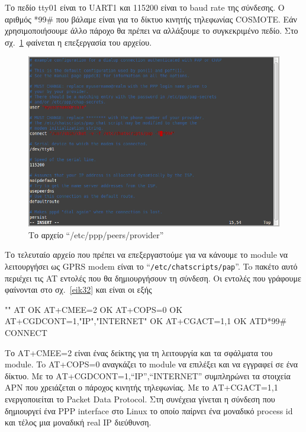\documentclass[12pt, a4paper, oneside]{report}
\begin{document}
Το πεδίο tty01 είναι το UART1 και 115200 είναι το baud rate της σύνδεσης. Ο αριθμός *99\#{} που βάλαμε είναι για το δίκτυο κινητής τηλεφωνίας COSMOTE. Εάν χρησιμοποιήσουμε άλλο πάροχο θα πρέπει να αλλάξουμε το συγκεκριμένο πεδίο. Στο σχ.~\ref{eik31} φαίνεται η επεξεργασία του αρχείου.
\clearpage
\begin{figure}[!h]
\centering
\includegraphics[scale=0.55]{eikona_31}
\caption{Το αρχείο ``\slash etc\slash ppp\slash peers\slash provider''}\label{eik31}
\end{figure}

Το τελευταίο αρχείο που πρέπει να επεξεργαστούμε για να κάνουμε το module να λειτουργήσει ως GPRS modem είναι το ``\texttt{\slash etc\slash chatscripts\slash pap}''. To πακέτο αυτό περιέχει τις AT εντολές που θα δημιουργήσουν τη σύνδεση. Οι εντολές που γράφουμε φαίνονται στο σχ.~\ref{eik32} και είναι οι εξής

\begin{code}
""			AT
OK			AT+CMEE=2
OK			AT+COPS=0
OK			AT+CGDCONT=1,"IP","INTERNET"
OK			AT+CGACT=1,1
OK			ATD*99#
CONNECT
\end{code}

Το ΑΤ+CMEE=2 είναι ένας δείκτης για τη λειτουργία και τα σφάλματα του module. To AT+COPS=0 αναγκάζει το module να επιλέξει και να εγγραφεί σε ένα δίκτυο. Με το ΑΤ+CGDCONT=1,``IP'',``INTERNET'' συμπληρώνει τα στοιχεία APN που χρειάζεται ο πάροχος κινητής τηλεφωνίας. Με το ΑΤ+CGACT=1,1 ενεργοποιείται το Packet Data Protocol. Στη συνέχεια γίνεται η σύνδεση που δημιουργεί ένα PPP interface στο Linux το οποίο παίρνει ένα μοναδικό process id και τέλος μια μοναδική real IP διεύθυνση.
\end{document}
